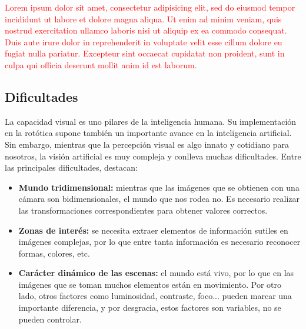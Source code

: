 \textcolor{red}{Lorem ipsum dolor sit amet, consectetur adipisicing elit, sed do
 eiusmod tempor incididunt ut labore et dolore magna aliqua. Ut enim ad minim 
 veniam, quis nostrud exercitation ullamco laboris nisi ut aliquip ex ea commodo 
 consequat. Duis aute irure dolor in reprehenderit in voluptate velit esse cillum
 dolore eu fugiat nulla pariatur. Excepteur sint occaecat cupidatat non proident,
 sunt in culpa qui officia deserunt mollit anim id est laborum.}

\subsection{Dificultades}
La capacidad visual es uno pilares de la inteligencia humana. Su implementación
en la rotótica supone también un importante avance en la inteligencia
artificial. Sin embargo, mientras que la percepción visual es algo innato y
cotidiano para nosotros, la visión artificial es muy compleja y conlleva muchas
dificultades. Entre las principales dificultades, destacan:

\begin{itemize}
  \item \textbf{Mundo tridimensional:} mientras que las imágenes que se
  obtienen con una cámara son bidimensionales, el mundo que nos rodea no. Es
  necesario realizar las transformaciones correspondientes para obtener valores
  correctos.
  \item \textbf{Zonas de interés:} se necesita extraer elementos de información 
  sutiles en imágenes complejas, por lo que entre tanta información es
  necesario reconocer formas, colores, etc.
  \item \textbf{Carácter dinámico de las escenas:} el mundo está vivo, por lo
  que en las imágenes que se toman muchos elementos están en movimiento. Por 
  otro lado, otros factores como luminosidad, contraste, foco... pueden marcar
  una importante diferencia, y por desgracia, estos factores son variables, no
  se pueden controlar.
\end{itemize}






